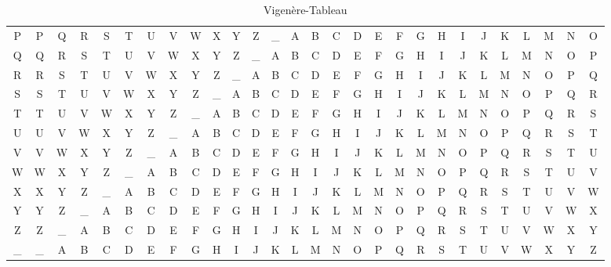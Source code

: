 \begin{table}[H]
\begin{tabular}{c|ccccc ccccc ccccc ccccc ccccc cc}
    P & P & Q & R & S & T & U & V & W & X & Y & Z & \_ & A & B & C & D & E & F & G & H & I & J & K & L & M & N & O \\
    Q & Q & R & S & T & U & V & W & X & Y & Z & \_ & A & B & C & D & E & F & G & H & I & J & K & L & M & N & O & P \\
    R & R & S & T & U & V & W & X & Y & Z & \_ & A & B & C & D & E & F & G & H & I & J & K & L & M & N & O & P & Q \\
    S & S & T & U & V & W & X & Y & Z & \_ & A & B & C & D & E & F & G & H & I & J & K & L & M & N & O & P & Q & R \\
    T & T & U & V & W & X & Y & Z & \_ & A & B & C & D & E & F & G & H & I & J & K & L & M & N & O & P & Q & R & S \\
    U & U & V & W & X & Y & Z & \_ & A & B & C & D & E & F & G & H & I & J & K & L & M & N & O & P & Q & R & S & T \\
    V & V & W & X & Y & Z & \_ & A & B & C & D & E & F & G & H & I & J & K & L & M & N & O & P & Q & R & S & T & U \\
    W & W & X & Y & Z & \_ & A & B & C & D & E & F & G & H & I & J & K & L & M & N & O & P & Q & R & S & T & U & V \\
    X & X & Y & Z & \_ & A & B & C & D & E & F & G & H & I & J & K & L & M & N & O & P & Q & R & S & T & U & V & W \\
    Y & Y & Z & \_ & A & B & C & D & E & F & G & H & I & J & K & L & M & N & O & P & Q & R & S & T & U & V & W & X \\
    Z & Z & \_ & A & B & C & D & E & F & G & H & I & J & K & L & M & N & O & P & Q & R & S & T & U & V & W & X & Y \\
    \_ & \_ & A & B & C & D & E & F & G & H & I & J & K & L & M & N & O & P & Q & R & S & T & U & V & W & X & Y & Z
  \end{tabular}
  
  \caption{Vigenère-Tableau}
  \label{tbl:vigenere}
\end{table}

